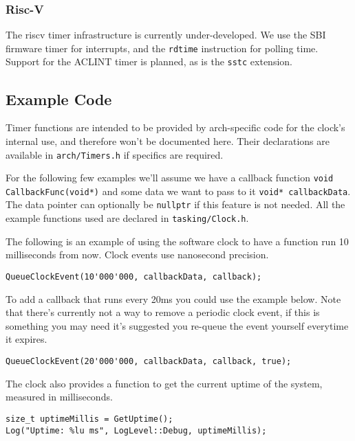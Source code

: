 \subsubsection{Risc-V}
The riscv timer infrastructure is currently under-developed. We use the SBI firmware timer for interrupts, and the \verb|rdtime| instruction for polling time. Support for the ACLINT timer is planned, as is the \verb|sstc| extension.

\subsection{Example Code}
Timer functions are intended to be provided by arch-specific code for the clock's internal use, and therefore won't be documented here. Their declarations are available in \verb|arch/Timers.h| if specifics are required.

For the following few examples we'll assume we have a callback function \verb|void CallbackFunc(void*)| and some data we want to pass to it \verb|void* callbackData|. The data pointer can optionally be \verb|nullptr| if this feature is not needed. All the example functions used are declared in \verb|tasking/Clock.h|.

The following is an example of using the software clock to have a function run 10 milliseconds from now. Clock events use nanosecond precision.
\begin{verbatim}
QueueClockEvent(10'000'000, callbackData, callback);
\end{verbatim}

To add a callback that runs every 20ms you could use the example below. Note that there's currently not a way to remove a periodic clock event, if this is something you may need it's suggested you re-queue the event yourself everytime it expires.
\begin{verbatim}
QueueClockEvent(20'000'000, callbackData, callback, true);
\end{verbatim}

The clock also provides a function to get the current uptime of the system, measured in milliseconds.
\begin{verbatim}
size_t uptimeMillis = GetUptime();
Log("Uptime: %lu ms", LogLevel::Debug, uptimeMillis);
\end{verbatim}
